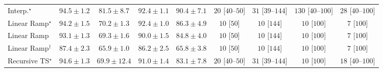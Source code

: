 \begin{tabular}{l|cccc|cccc|}
Interp.$^\star$ & {\cellcolor[HTML]{6C2706}} \color[HTML]{F1F1F1} $94.5\pm 1.2$ & {\cellcolor[HTML]{DE610C}} \color[HTML]{F1F1F1} $81.5\pm 8.7$ & {\cellcolor[HTML]{812D05}} \color[HTML]{F1F1F1} $92.4\pm 1.1$ & {\cellcolor[HTML]{943304}} \color[HTML]{F1F1F1} $90.4\pm 7.1$ & {\cellcolor[HTML]{FFF3F0}} \color[HTML]{000000} $20$ [$40$--$50$] & {\cellcolor[HTML]{FEF1ED}} \color[HTML]{000000} $31$ [$39$--$144$] & {\cellcolor[HTML]{FDD8D5}} \color[HTML]{000000} $130$ [$40$--$100$] & {\cellcolor[HTML]{FEF1ED}} \color[HTML]{000000} $28$ [$40$--$100$] \\
Linear Ramp$^\star$ & {\cellcolor[HTML]{702806}} \color[HTML]{F1F1F1} $94.2\pm 1.5$ & {\cellcolor[HTML]{FEB744}} \color[HTML]{000000} $70.2\pm 1.3$ & {\cellcolor[HTML]{812D05}} \color[HTML]{F1F1F1} $92.4\pm 1.0$ & {\cellcolor[HTML]{BC4503}} \color[HTML]{F1F1F1} $86.3\pm 4.9$ & {\cellcolor[HTML]{FFF6F2}} \color[HTML]{000000} $10$ [$50$] & {\cellcolor[HTML]{FFF6F2}} \color[HTML]{000000} $10$ [$144$] & {\cellcolor[HTML]{FFF6F2}} \color[HTML]{000000} $10$ [$100$] & {\cellcolor[HTML]{FFF6F2}} \color[HTML]{000000} $7$ [$100$] \\
Linear Ramp & {\cellcolor[HTML]{7B2B05}} \color[HTML]{F1F1F1} $93.1\pm 1.3$ & {\cellcolor[HTML]{FEBF4B}} \color[HTML]{000000} $69.3\pm 1.6$ & {\cellcolor[HTML]{983404}} \color[HTML]{F1F1F1} $90.0\pm 1.5$ & {\cellcolor[HTML]{CB4B02}} \color[HTML]{F1F1F1} $84.8\pm 4.0$ & {\cellcolor[HTML]{FFF6F2}} \color[HTML]{000000} $10$ [$50$] & {\cellcolor[HTML]{FFF6F2}} \color[HTML]{000000} $10$ [$144$] & {\cellcolor[HTML]{FFF6F2}} \color[HTML]{000000} $10$ [$100$] & {\cellcolor[HTML]{FFF6F2}} \color[HTML]{000000} $7$ [$100$] \\
Linear Ramp$^\dagger$ & {\cellcolor[HTML]{B13F03}} \color[HTML]{F1F1F1} $87.4\pm 2.3$ & {\cellcolor[HTML]{FED471}} \color[HTML]{000000} $65.9\pm 1.0$ & {\cellcolor[HTML]{BC4503}} \color[HTML]{F1F1F1} $86.2\pm 2.5$ & {\cellcolor[HTML]{FED573}} \color[HTML]{000000} $65.8\pm 3.8$ & {\cellcolor[HTML]{FFF6F2}} \color[HTML]{000000} $10$ [$50$] & {\cellcolor[HTML]{FFF6F2}} \color[HTML]{000000} $10$ [$144$] & {\cellcolor[HTML]{FFF6F2}} \color[HTML]{000000} $10$ [$100$] & {\cellcolor[HTML]{FFF6F2}} \color[HTML]{000000} $7$ [$100$] \\
Recursive TS$^\star$ & {\cellcolor[HTML]{6C2706}} \color[HTML]{F1F1F1} $94.6\pm 1.3$ & {\cellcolor[HTML]{FEBA46}} \color[HTML]{000000} $69.9\pm 12.4$ & {\cellcolor[HTML]{8E3104}} \color[HTML]{F1F1F1} $91.0\pm 1.4$ & {\cellcolor[HTML]{D55607}} \color[HTML]{F1F1F1} $83.1\pm 7.8$ & {\cellcolor[HTML]{FFF3F0}} \color[HTML]{000000} $20$ [$40$--$50$] & {\cellcolor[HTML]{FEF1ED}} \color[HTML]{000000} $31$ [$39$--$144$] & {\cellcolor[HTML]{FFF6F2}} \color[HTML]{000000} $10$ [$100$] & {\cellcolor[HTML]{FFF3F0}} \color[HTML]{000000} $18$ [$40$--$100$] \\

\end{tabular}
